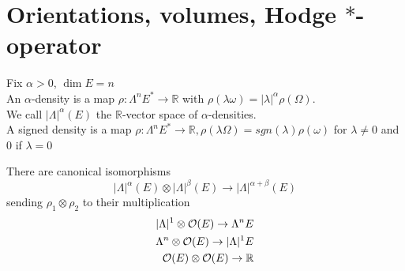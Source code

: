 \documentclass[../main.tex]{subfiles}
\begin{document}
\section{Orientations, volumes, Hodge $\ast$-operator}
\begin{defn}
	Fix $\alpha>0$, $\dim E = n$ \\
	An $\alpha$-density is a map $\rho:\Lambda^{n}E^{\ast}\to \mathbb{R}$ with $\rho( \lambda \omega) = |\lambda|^{\alpha}\rho( \Omega) $.\\
	We call $|\Lambda|^{\alpha}( E) $ the $ \mathbb{R}$-vector space of $\alpha$-densities.\\
	A signed density is a map $\rho: \Lambda^{n}E^{\ast}\to \mathbb{R}, \rho( \lambda \Omega) = sgn( \lambda) \rho( \omega) $ for $\lambda\neq 0$ and $0$ if $\lambda=0$ 
\end{defn}
\begin{lemma}
There are canonical isomorphisms
\[ 
|\Lambda|^{\alpha}( E) \otimes |\Lambda|^{\beta}( E) \to |\Lambda|^{\alpha+ \beta}( E) 
\]
sending $\rho_1\otimes \rho_2$ to their multiplication
\begin{align*}
|\Lambda|^{1}\otimes \mathcal{O}( E) \to \Lambda^{n}E\\
\Lambda^{n}\otimes \mathcal{O}( E) \to |\Lambda|^{1}E\\
\mathcal{O}( E) \otimes \mathcal{O}( E) \to \mathbb{R}
\end{align*}

\end{lemma}
\end{document}
